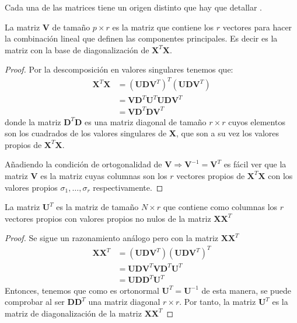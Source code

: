 \noindent Cada una de las matrices tiene un origen distinto que hay que detallar \cite{Johnson 1963}.

\begin{propo}
La matriz $\mathbf{V}$ de tamaño $p\times r$ es la matriz que contiene los $r$ vectores para hacer la combinación lineal que definen las componentes principales. Es decir es la matriz con la base de diagonalización de $\mathbf{X}^T\mathbf{X}$.
\begin{proof}
Por la descomposición en valores singulares tenemos que:
\begin{align*}
\textbf{X}^T \textbf{X} &= (\textbf{U}\mathbf{D} \textbf{V}^T)^T (\textbf{U}\mathbf{D} \textbf{V}^T)\\
&= \textbf{V}\mathbf{D} ^T \textbf{U}^T \textbf{U}\mathbf{D} \textbf{V}^T\\
&= \textbf{V}\mathbf{D} ^T \mathbf{D} \textbf{V}^T
\end{align*}
donde la matriz $\mathbf{D} ^T \mathbf{D} $ es una matriz diagonal de tamaño $r \times r$ cuyos elementos son los cuadrados de los valores singulares de \textbf{X}, que son a su vez los valores propios de $\textbf{X}^T \textbf{X}$. 

\noindent Añadiendo la condición de ortogonalidad de $\textbf{V}\Rightarrow \textbf{V}^{-1}=\mathbf{V}^T$ es fácil ver que la matriz \textbf{V} es la matriz cuyas columnas son los $r$ vectores propios de $\textbf{X}^T\textbf{X}$ con los valores propios $\sigma_1,\ldots, \sigma_r$ respectivamente.
\end{proof}
\end{propo}

\begin{propo}
La matriz $\mathbf{U}^T$ es la matriz de tamaño $N\times r$ que contiene como columnas los $r$ vectores propios con valores propios no nulos de la matriz $\mathbf{XX}^T$
\begin{proof}
Se sigue un razonamiento análogo pero con la matriz $\mathbf{XX}^T$
\begin{align*}
\textbf{X} \textbf{X}^T  &= (\textbf{U}\mathbf{D} \textbf{V}^T)(\textbf{U}\mathbf{D} \textbf{V}^T)^T\\
&= \mathbf{UDV}^T\mathbf{VD}^T\mathbf{U}^T\\
&= \mathbf{UDD}^T\mathbf{U}^T
\end{align*}
Entonces, tenemos que como es ortonormal $\mathbf{U}^T=\mathbf{U}^{-1}$ de esta manera, se puede comprobar al ser $\mathbf{DD}^T$ una matriz diagonal $r\times r$. Por tanto, la matriz $\mathbf{U}^T$ es la matriz de diagonalización de la matriz $\mathbf{XX}^T$
\end{proof}
\end{propo}

